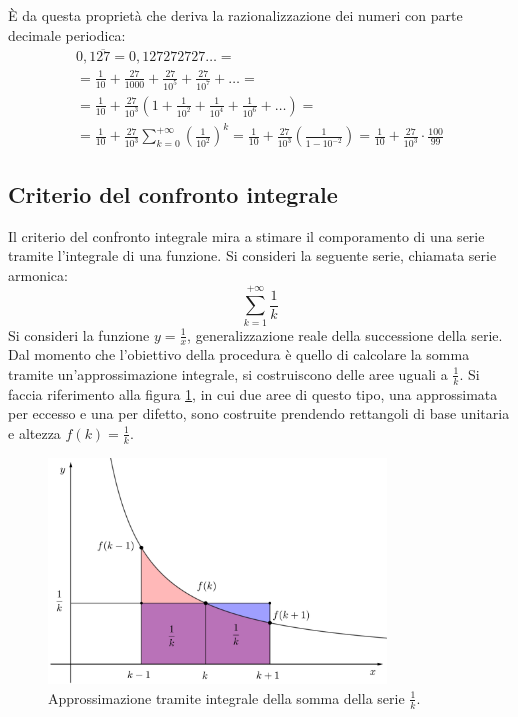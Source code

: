 È da questa proprietà che deriva la razionalizzazione dei numeri con parte decimale periodica:
\begin{gather*}
	0,1\overline{27}=0,127272727\dots=\\
	=\frac{1}{10}+\frac{27}{1000}+\frac{27}{10^5}+\frac{27}{10^7}+\dots=\\
	=\frac{1}{10}+\frac{27}{10^3}\left(1+\frac{1}{10^2}+\frac{1}{10^4}+\frac{1}{10^6}+\dots\right)=\\
	=\frac{1}{10}+\frac{27}{10^3}\sum_{k=0}^{+\infty}\left(\frac{1}{10^2}\right)^k=\frac{1}{10}+\frac{27}{10^3}\left(\frac{1}{1-10^{-2}}\right)=\frac{1}{10}+\frac{27}{10^3}\cdot\frac{100}{99}
\end{gather*}


\subsection{Criterio del confronto integrale} \label{confint}
Il criterio del confronto integrale mira a stimare il comporamento di una serie tramite l'integrale di una funzione. Si consideri la seguente serie, chiamata serie armonica:
\[
	\sum_{k=1}^{+\infty}\frac{1}{k}
\]
Si consideri la funzione $y=\frac{1}{x}$, generalizzazione reale della successione della serie. Dal momento che l'obiettivo della procedura è quello di calcolare la somma tramite un'approssimazione integrale, si costruiscono delle aree uguali a $\frac{1}{k}$. Si faccia riferimento alla figura \ref{fig:intk}, in cui due aree di questo tipo, una approssimata per eccesso e una per difetto, sono costruite prendendo rettangoli di base unitaria e altezza $f(k)=\frac{1}{k}$.
\begin{figure}[ht]
	\centering
	\includegraphics[width=0.8\textwidth]{grafici/intk}
	\caption{Approssimazione tramite integrale della somma della serie $\frac{1}{k}$.}
	\label{fig:intk}
\end{figure}
